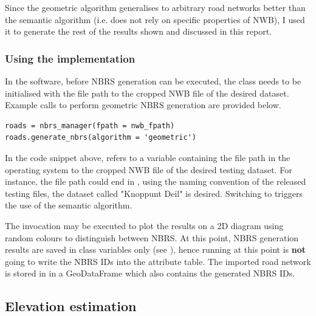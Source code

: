 Since the geometric algorithm generalises to arbitrary road networks better than the semantic algorithm (i.e. does not rely on specific properties of NWB), I used it to generate the rest of the results shown and discussed in this report.

\subsubsection{Using the implementation}

In the software, before NBRS generation can be executed, the  class needs to be initialised with the file path to the cropped NWB file of the desired dataset. Example calls to perform geometric NBRS generation are provided below.

\begin{lstlisting}
roads = nbrs_manager(fpath = nwb_fpath)
roads.generate_nbrs(algorithm = 'geometric')
\end{lstlisting}

In the code snippet above,  refers to a variable containing the file path in the operating system to the cropped NWB file of the desired testing dataset. For instance, the file path could end in , using the naming convention of the released testing files, the dataset called "Knoppunt Deil" is desired. Switching to  triggers the use of the semantic algorithm.

The invocation  may be executed to plot the results on a 2D diagram using random colours to distinguish between NBRS. At this point, NBRS generation results are saved in class variables only (see ), hence running  at this point is \textbf{not} going to write the NBRS IDs into the attribute table. The imported road network is stored in  in a GeoDataFrame which also contains the generated NBRS IDs.

\subsection{Elevation estimation}
\label{sub:r_elevationestimation}

